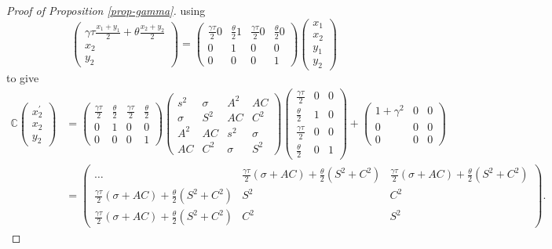 \documentclass[
]{article}
\theoremstyle{definition}
\theoremstyle{definition}
\theoremstyle{definition}
\theoremstyle{definition}
\theoremstyle{remark}
\begin{document}
\begin{proof}[Proof of Proposition \ref{prop-gamma}]
using
\[
\left(\begin{array}{c}
\gamma\tau\frac{x_{1}+y_{1}}{2}+\theta\frac{x_{2}+y_{2}}{2}\\
x_{2}\\
y_{2}
\end{array}\right)=\left(\begin{array}{cccc}
\frac{\gamma\tau}{2}0 & \frac{\theta}{2}1 & \frac{\gamma\tau}{2}0 & \frac{\theta}{2}0\\
0 & 1 & 0 & 0\\
0 & 0 & 0 & 1
\end{array}\right)\left(\begin{array}{c}
x_{1}\\
x_{2}\\
y_{1}\\
y_{2}
\end{array}\right)
\]
to give
{\small\begin{align*}
\mathbb{C}\left(\begin{array}{c}
x_{2}^{\prime}\\
x_{2}\\
y_{2}
\end{array}\right) & =\left(\begin{array}{cccc}
\frac{\gamma\tau}{2} & \frac{\theta}{2} & \frac{\gamma\tau}{2} & \frac{\theta}{2}\\
0 & 1 & 0 & 0\\
0 & 0 & 0 & 1
\end{array}\right)\left(\begin{array}{cccc}
s^{2} & \sigma & A^{2} & AC\\
\sigma & S^{2} & AC & C^{2}\\
A^{2} & AC & s^{2} & \sigma\\
AC & C^{2} & \sigma & S^{2}
\end{array}\right)\left(\begin{array}{ccc}
\frac{\gamma\tau}{2} & 0 & 0\\
\frac{\theta}{2} & 1 & 0\\
\frac{\gamma\tau}{2} & 0 & 0\\
\frac{\theta}{2} & 0 & 1
\end{array}\right)+\left(\begin{array}{ccc}
1+\gamma^{2} & 0 & 0\\
0 & 0 & 0\\
0 & 0 & 0
\end{array}\right)\\
 & =\left(\begin{array}{ccc}
\ldots & \frac{\gamma\tau}{2}(\sigma+AC)+\frac{\theta}{2}(S^{2}+C^{2}) & \frac{\gamma\tau}{2}(\sigma+AC)+\frac{\theta}{2}(S^{2}+C^{2})\\
\frac{\gamma\tau}{2}(\sigma+AC)+\frac{\theta}{2}(S^{2}+C^{2}) & S^{2} & C^{2}\\
\frac{\gamma\tau}{2}(\sigma+AC)+\frac{\theta}{2}(S^{2}+C^{2}) & C^{2} & S^{2}
\end{array}\right).
\end{align*}}%


\end{proof}
\end{document}

